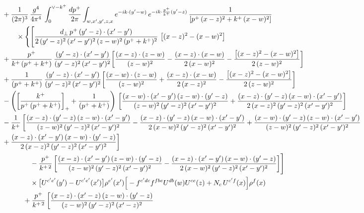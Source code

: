 \documentclass[10pt]{article}
\begin{document}
\begin{align}
&+\frac{1}{(2\pi)^{3}}\,\frac{g^{4}}{4\pi^{4}}\,\int_{0}^{\vee-k^{+}}\frac{dp^{+}}{2\pi}\int_{w,x^{\prime},y^{\prime},z,x}e^{-ik\cdot(y^{\prime}-w)}\,e^{-ik\cdot\frac{p^{+}}{k^{+}}(y^{\prime}-z)}\,\frac{1}{\left[p^{+}\,(x-z)^{2}+k^{+}\,(x-w)^{2}\right]}\notag\\&\qquad\times\Bigg\{\Bigg[\frac{d_{\perp}\,p^{+}\,(y^{\prime}-z)\cdot(x^{\prime}-y^{\prime})}{2\,(y^{\prime}-z)^{2}\,(x^{\prime}-y^{\prime})^{2}\,(z-w)^{2}\,(p^{+}+k^{+})^{2}}\, \left[(x-z)^{2}-(x-w)^{2}\right]\notag \\ & +\frac{p^{+}}{k^{+}\,(p^{+}+k^{+})}\,\frac{(y^{\prime}-z)\cdot(x^{\prime}-y^{\prime})}{(y^{\prime}-z)^{2}\,(x^{\prime}-y^{\prime})^{2}}\bigg[\frac{(x-z)\cdot (z-w)}{(z-w)^{2}} -\frac{(x-z)\cdot (x-w)}{2\,(x-w)^{2}}-\frac{\left[(x-z)^{2}-(x-w)^{2}\right]}{2\,(z-w)^{2}}\bigg]\notag \\ & +\frac{1}{(p^{+}+k^{+})}\,\frac{(y^{\prime}-z)\cdot(x^{\prime}-y^{\prime})}{(y^{\prime}-z)^{2}\,(x^{\prime}-y^{\prime})^{2}}\bigg[\frac{(x-w)\cdot (z-w)}{(z-w)^{2}}+\frac{(x-z)\cdot (x-w)}{2\,(x-z)^{2}} -\frac{\left[(x-z)^{2}-(x-w)^{2}\right]}{2\,(z-w)^{2}}\bigg]\notag \\ & -\left(\left[\frac{k^{+}}{p^{+}\,(p^{+}+k^{+})}\right]_{+}+\frac{1}{(p^{+}+k^{+})}\right)\,\bigg[\frac{(x-w)\cdot(x^{\prime}-y^{\prime})\,(z-w)\cdot(y^{\prime}-z)}{(z-w)^{2}\,(y^{\prime}-z)^{2}\,(x^{\prime}-y^{\prime})^{2}}+\frac{(x-z)\cdot(y^{\prime}-z)\,(x-w)\cdot(x^{\prime}-y^{\prime})}{2\,(x-z)^{2}\,(y^{\prime}-z)^{2}\,(x^{\prime}-y^{\prime})^{2}}\bigg]\notag \\ & -\frac{1}{k^{+}}\,\bigg[\frac{(x-z)\cdot(y^{\prime}-z)\,(z-w)\cdot(x^{\prime}-y^{\prime})}{(z-w)^{2}\,(y^{\prime}-z)^{2}\,(x^{\prime}-y^{\prime})^{2}}-\frac{(x-z)\cdot(y^{\prime}-z)\,(x-w)\cdot(x^{\prime}-y^{\prime})}{2\,(x-w)^{2}\,(y^{\prime}-z)^{2}\,(x^{\prime}-y^{\prime})^{2}}+\frac{(x-w)\cdot(y^{\prime}-z)\,(z-w)\cdot(x^{\prime}-y^{\prime})}{(z-w)^{2}\,(y^{\prime}-z)^{2}\,(x^{\prime}-y^{\prime})^{2}} \notag \\ & +\frac{(x-z)\cdot(x^{\prime}-y^{\prime})\,(x-w)\cdot(y^{\prime}-z)}{2\,(x-z)^{2}\,(y^{\prime}-z)^{2}\,(x^{\prime}-y^{\prime})^{2}}\bigg]\notag\\&\qquad\qquad-\frac{p^{+}}{k^{+\,2}}\,\bigg[\frac{(x-z)\cdot(x^{\prime}-y^{\prime})\,(z-w)\cdot(y^{\prime}-z)}{(z-w)^{2}\,(y^{\prime}-z)^{2}\,(x^{\prime}-y^{\prime})^{2}} -\frac{(x-z)\cdot(x^{\prime}-y^{\prime})\,(x-w)\cdot(y^{\prime}-z)}{2\,(x-w)^{2}\,(y^{\prime}-z)^{2}\,(x^{\prime}-y^{\prime})^{2}}\bigg]\Bigg]\notag\\&\qquad\qquad\times\big[U^{c^{\prime}e^{\prime}}(y^{\prime})-U^{c^{\prime}e^{\prime}}(x^{\prime})\big]\rho^{e^{\prime}}(x^{\prime})\Big[-f^{c^{\prime}dc}f^{fbe}U^{db}(w)U^{ce}(z)+N_{c}\,U^{c^{\prime}f}(x)\Big]\rho^{f}(x)\notag\\&\qquad\quad+\frac{p^{+}}{k^{+\,2}}\,\bigg[\frac{(x-z)\cdot(x^{\prime}-z)\,(z-w)\cdot(y^{\prime}-z)}{(z-w)^{2}\,(y^{\prime}-z)^{2}\,(x^{\prime}-z)^{2}} 
\end{align}
\end{document}
